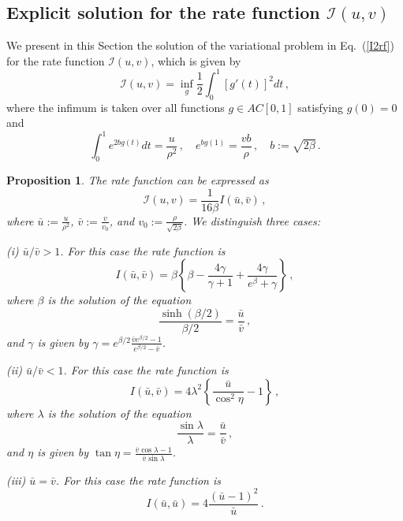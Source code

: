 \documentclass[11pt]{article}
\numberwithin{equation}{section}
\theoremstyle{plain}
\newtheorem{proposition}[theorem]{Proposition}
\begin{document}
\subsection{Explicit solution for the rate function $\mathcal{I}(u,v)$}

We present in this Section the solution of the variational problem in Eq.~(\ref{I2rf}) for the rate 
function $\mathcal{I}(u,v)$, which is given by
\begin{equation}
\mathcal{I}(u,v) = \inf_g \frac12 \int_0^1 [g'(t)]^2 dt\,,
\end{equation}
where the infimum is taken over all functions $g\in AC[0,1]$ satisfying
$g(0)=0$ and
\begin{equation}
\int_0^1 e^{2b g(t)} dt = \frac{u}{\rho^2}\,,\quad
e^{b g(1)} = \frac{vb}{\rho}\,,\quad
b := \sqrt{2\beta}\,.
\end{equation}


\begin{proposition}
The rate function can be expressed as
\begin{equation}\label{Iuvscale}
\mathcal{I}(u,v) = 
\frac{1}{16\beta} I(\bar u, \bar v)\,,
\end{equation}
where 
$\bar u := \frac{u}{\rho^2}$,
$\bar v := \frac{v}{v_0}$, and $v_0 := \frac{\rho}{\sqrt{2\beta}}$.
We distinguish three cases:

(i) $\bar u/\bar v>1$. For this case the rate function is
\begin{equation}\label{rf1}
I(\bar u,\bar v) = \beta \left\{ \beta 
- \frac{4\gamma}{\gamma+1} + \frac{4\gamma}{e^\beta + \gamma} \right\}\,,
\end{equation}
where $\beta$ is the solution of the equation
\begin{equation}\label{eqbeta}
\frac{\sinh(\beta/2)}{\beta/2} = \frac{\bar u }{\bar v}\,,
\end{equation}
and $\gamma$ is given by $\gamma = e^{\beta/2} \frac{\bar v e^{\beta/2} - 1}{e^{\beta/2} - \bar v}$.

(ii) $\bar u/\bar v<1$. For this case the rate function is
\begin{equation}
I(\bar u,\bar v) =  4\lambda^2
\left\{ \frac{\bar u}{\cos^2\eta}-1 \right\}\,,
\end{equation}
where $\lambda$ is the solution of the equation
\begin{equation}\label{eqlam}
\frac{\sin \lambda}{\lambda} = \frac{\bar u }{\bar v}\,,
\end{equation}
and $\eta$ is given by
$\tan\eta = \frac{\bar v\cos\lambda - 1}{\bar v\sin\lambda}$.

(iii) $\bar u = \bar v$. For this case the rate function is
\begin{equation}\label{rf3}
I(\bar u,\bar u) = 4 \frac{(\bar u-1)^2}{\bar u}\,.
\end{equation}
\end{proposition}
\end{document}
